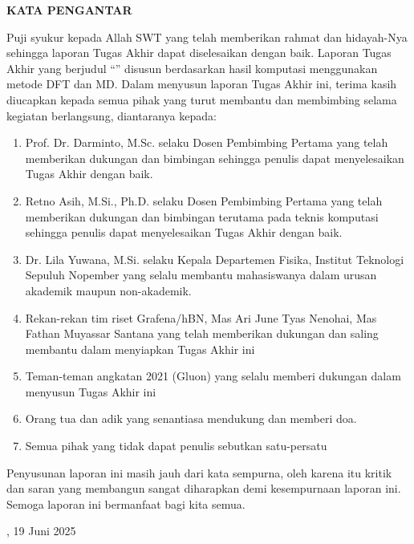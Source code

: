 \pagebreak
\begin{center}
    {\textbf{KATA PENGANTAR}}
    \pagestyle{fancy}
\end{center}

Puji syukur kepada Allah SWT yang telah memberikan rahmat dan hidayah-Nya sehingga laporan Tugas Akhir dapat diselesaikan dengan baik. Laporan Tugas Akhir yang berjudul “\judulTA” disusun berdasarkan hasil komputasi menggunakan metode DFT dan MD. Dalam menyusun laporan Tugas Akhir ini, terima kasih diucapkan kepada semua pihak yang turut membantu dan membimbing selama kegiatan berlangsung, diantaranya kepada:
\begin{enumerate}
    \item Prof. Dr. Darminto, M.Sc. selaku Dosen Pembimbing Pertama yang telah memberikan dukungan dan bimbingan sehingga penulis dapat menyelesaikan Tugas Akhir dengan baik.
    \item Retno Asih, M.Si., Ph.D. selaku Dosen Pembimbing Pertama yang telah memberikan dukungan dan bimbingan terutama pada teknis komputasi sehingga penulis dapat menyelesaikan Tugas Akhir dengan baik.
    \item Dr. Lila Yuwana, M.Si. selaku Kepala Departemen Fisika, Institut Teknologi Sepuluh Nopember yang selalu membantu mahasiswanya dalam urusan akademik maupun non-akademik.
    \item Rekan-rekan tim riset Grafena/hBN, Mas Ari June Tyas Nenohai, Mas Fathan Muyassar Santana yang telah memberikan dukungan dan saling membantu dalam menyiapkan Tugas Akhir ini
    \item Teman-teman angkatan 2021 (Gluon) yang selalu memberi dukungan dalam menyusun Tugas Akhir ini
    \item Orang tua dan adik yang senantiasa mendukung dan memberi doa.
    \item Semua pihak yang tidak dapat penulis sebutkan satu-persatu
    
\end{enumerate}
Penyusunan laporan ini masih jauh dari kata sempurna, oleh karena itu kritik dan saran yang membangun sangat diharapkan demi kesempurnaan laporan ini. Semoga laporan ini bermanfaat bagi kita semua.
\vspace{6mm}

\begin{flushright}

\namaKota, 19 Juni 2025

\vspace{15mm}

\namaMahasiswa

\end{flushright}

\newpage